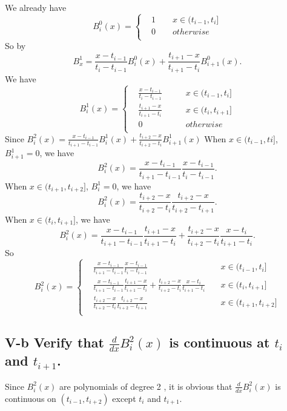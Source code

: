 \documentclass[twoside,a4paper]{article}
\begin{document}
We already have 
\[ B^{0}_{i}\left( x \right)=\left\{
	\begin{aligned}
		&1\qquad x\in (t_{i-1},t_{i}]\\
		&0\qquad otherwise\\
	\end{aligned}
	\right.
\] 
So by 
\[
	B^{1}_{x}=\frac{x-t_{i-1}}{t_i-t_{i-1}}B^{0}_{i}\left(  x\right)+\frac{t_{i+1}-x}{t_{i+1}-t_i}B^{0}_{i+1}\left( x \right)  
.\] 
We have 
\[
B^{1}_{i}\left( x \right)=\left\{
	\begin{aligned}
		&\frac{x-t_{i-1}}{t_{i}-t_{i-1}}&\qquad x\in(t_{i-1},t_i]\\
		&\frac{t_{i+1}-x}{t_{i+1}-t_i}&\qquad x\in(t_i,t_{i+1}]\\
		&0&\qquad otherwise\\
	\end{aligned}
\right.\]
Since $B^{2}_{i}\left( x \right)=\frac{x-t_{i-1}}{t_{i+1}-t_{i-1}}B^{1}_{i}\left( x \right)
+\frac{t_{i+2}-x}{t_{i+2}-t_{i}}B^{1}_{i+1}\left( x \right)   $ 
When $x\in(t_{i-1},ti]$, $B^{1}_{i+1}=0$, we have
\[
	B^{2}_{i}\left( x \right)= \frac{x-t_{i-1}}{t_{i+1}-t_{i-1}}\frac{x-t_{i-1}}{t_{i}-t_{i-1}}
.\] 
When $x\in(t_{i+1},t_{i+2}]$, $B^{1}_{i}=0$, we have
\[
	B^{2}_{i}\left( x \right)=\frac{t_{i+2}-x}{t_{i+2}-t_{i}}\frac{t_{i+2}-x}{t_{i+2}-t_{i+1}} 
.\]
When $x\in(t_i,t_{i+1}]$, we have
\[
	B^{2}_{i}\left( x \right)=\frac{x-t_{i-1}}{t_{i+1}-t_{i-1}}\frac{t_{i+1}-x}{t_{i+1}-t_i}
	+\frac{t_{i+2}-x}{t_{i+2}-t_{i}}\frac{x-t_{i}}{t_{i+1}-t_{i}}
.\] 
So 
\[
	B^{2}_{i}\left( x \right)=\left\{
		\begin{aligned}
			&\frac{x-t_{i-1}}{t_{i+1}-t_{i-1}}\frac{x-t_{i-1}}{t_{i}-t_{i-1}}&\quad x\in(t_{i-1},t_{i}]\\
			&\frac{x-t_{i-1}}{t_{i+1}-t_{i-1}}\frac{t_{i+1}-x}{t_{i+1}-t_i}
			+\frac{t_{i+2}-x}{t_{i+2}-t_{i}}\frac{x-t_{i}}{t_{i+1}-t_{i}}&\quad x\in(t_i,t_{i+1}]\\
			&\frac{t_{i+2}-x}{t_{i+2}-t_{i}}\frac{t_{i+2}-x}{t_{i+2}-t_{i+1}}&\quad x\in(t_{i+1},t_{i+2}]\\ 
		\end{aligned}
\right.\] 

\subsection*{V-b \small{Verify that $\frac{d}{dx}B^{2}_{i}\left( x \right) $ is continuous at $t_i$ and $t_{i+1}$.}}

Since $B^{2}_{i}\left( x \right)$ are polynomials of degree 2
, it is obvious that $\frac{d}{dx}B^{2}_{i}\left( x \right) $ is continuous on $\left(  t_{i-1},t_{i+2}\right) $ 
except $t_{i}$ and $t_{i+1}$.
\end{document}
